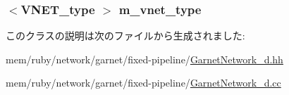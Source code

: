\label{classGarnetNetwork__d_ae7629b040e81ae59a25acc0231c7e182}
\hypertarget{classGarnetNetwork__d_a1ec4cc76a3ec5a7f50db8e24ffa2af31}{
\subsubsection[{m\_\-vnet\_\-type}]{$<${\bf VNET\_\-type} $>$ {\bf m\_\-vnet\_\-type}}}
\label{classGarnetNetwork__d_a1ec4cc76a3ec5a7f50db8e24ffa2af31}


このクラスの説明は次のファイルから生成されました:\begin{DoxyCompactItemize}
\item 
mem/ruby/network/garnet/fixed-\/pipeline/\hyperlink{GarnetNetwork__d_8hh}{GarnetNetwork\_\-d.hh}\item 
mem/ruby/network/garnet/fixed-\/pipeline/\hyperlink{GarnetNetwork__d_8cc}{GarnetNetwork\_\-d.cc}\end{DoxyCompactItemize}
